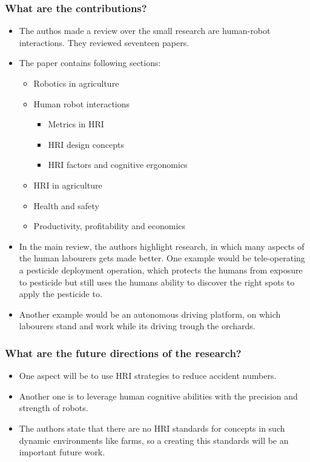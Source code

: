     \subsubsection*{What are the contributions?}
    \begin{itemize}
        \item The authos made a review over the small research are human-robot interactions. They reviewed seventeen papers.
        \item The paper contains following sections: \ \begin{itemize}
            \item Robotics in agriculture
            \item Human robot interactions \ \begin{itemize}
                \item Metrics in HRI
                \item HRI design concepts
                \item HRI factors and cognitive ergonomics
            \end{itemize}
            \item HRI in agriculture
            \item Health and safety
            \item Productivity, profitability and economics
        \end{itemize}
        \item In the main review, the authors highlight research, in which many aspects of the human labourers gets made better. One example would be tele-operating a pesticide deployment operation, which protects the humans from exposure to pesticide but still uses the humans ability to discover the right spots to apply the pesticide to. 
        \item Another example would be an autonomous driving platform, on which labourers stand and work while its driving trough the orchards.
    \end{itemize}
    \subsubsection*{What are the future directions of the research?}
    \begin{itemize}
        \item One aspect will be to use HRI strategies to reduce accident numbers.
        \item Another one is to leverage human cognitive abilities with the precision and strength of robots.
        \item The authors state that there are no HRI standards for concepts in such dynamic environments like farms, so a creating this standards will be an important future work.
    \end{itemize}
